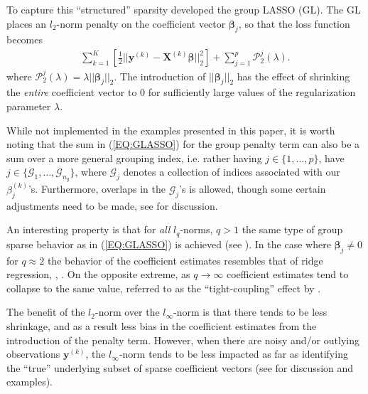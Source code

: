 \documentclass{article}
\numberwithin{equation}{section}
\theoremstyle{plain}
\newcommand{\bs}{\boldsymbol}
\begin{document}
To capture this ``structured'' sparsity \cite{yuan06} developed the group LASSO
(GL). The GL places an $l_2$-norm penalty on the coefficient vector
$\bs\beta_j$, so that the loss function becomes
\begin{align}
\label{EQ:GLASSO}
\sum_{k=1}^K
\left[ 
\frac{1}{2}||\mathbf{y}^{(k)} - \mathbf{X}^{(k)}\bs\beta||_2^2
\right]
+
\sum_{j=1}^p\mathcal{P}_2^{j}(\lambda).
\end{align}
\noindent where $\mathcal{P}_2^{j}(\lambda) = \lambda
||\bs\beta_j||_2$. The introduction of $||\bs\beta_j||_2$ has the effect of
shrinking the {\it entire} coefficient vector to 0 for sufficiently large
values of the regularization parameter $\lambda$. 

While not implemented in the examples presented in this paper, it is worth
noting that the sum in (\ref{EQ:GLASSO}) for the group penalty term can also be
a sum over a more general grouping index, i.e. rather having $j \in \{1, \ldots,
p \}$, have $j \in \{\mathcal{G}_1, \ldots, \mathcal{G}_{n_g} \}$, where
$\mathcal{G}_j$ denotes a collection of indices associated with our
$\beta_j^{(k)}$'s. Furthermore, overlaps in the $\mathcal{G}_j$'s is allowed,
though some certain adjustments need to be made, see \cite{jacob2009} for
discussion.
 
An interesting property is that
for {\it all} $l_q$-norms, $q > 1$ the same type of group sparse behavior as
in (\ref{EQ:GLASSO}) is achieved (see \cite{vogt2012}).
In the case where $\bs\beta_j \neq 0$ for $q \approx 2$ the behavior of the coefficient
estimates resembles that of ridge regression, \cite{hastie2009},
\cite{simon2013}. On the opposite extreme, as $q \rightarrow \infty$
coefficient estimates tend to collapse to the same value, 
referred to as the ``tight-coupling'' effect by \cite{vogt2012}.

The benefit of the $l_2$-norm over the $l_{\infty}$-norm is that there tends to
be less shrinkage, and as a result less bias in the coefficient estimates from
the introduction of the penalty term.
However, when there are noisy and/or outlying observations $\mathbf{y}^{(k)}$,
the $l_{\infty}$-norm tends to be less impacted as far as identifying the ``true''
underlying subset of sparse coefficient vectors (see \cite{sgen2014} for
discussion and examples).
\end{document}

